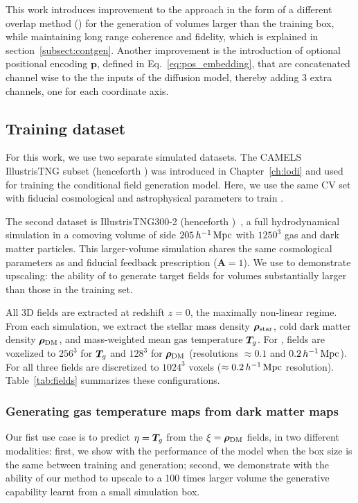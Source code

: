 This work introduces improvement to the \LODI approach in the form of a different overlap method (\FOLD) for the generation of volumes larger than the training box, while maintaining long range coherence and fidelity, which is explained in section~\ref{subsect:contgen}. Another improvement is the introduction of optional positional encoding $\mathbf{p}$, defined in Eq.~\ref{eq:pos_embedding}, that are concatenated channel wise to the the inputs of the diffusion model, thereby adding 3 extra channels, one for each coordinate axis.


\subsection{Training dataset}
For this work, we use two separate simulated datasets. The CAMELS IllustrisTNG subset (henceforth \CAMELS) was introduced in Chapter~\ref{ch:lodi} and used for training the conditional field generation model. Here, we use the same CV set with fiducial cosmological and astrophysical parameters to train \FOLD.

The second dataset is IllustrisTNG300-2 (henceforth \TNG)~\citep{nelson2021illustristngsimulationspublicdata}, a full hydrodynamical simulation in a comoving volume of side $205\,h^{-1}\,\mathrm{Mpc}$
with $1250^3$ gas and dark matter particles. This larger-volume simulation shares the same cosmological parameters as \CAMELS and fiducial feedback prescription ($\mathbf{A}=1$). We use \TNG to demonstrate upscaling: the ability of \FOLD to generate target fields for volumes substantially larger than those in the training set.

All 3D fields are extracted at redshift $z=0$, the maximally non-linear regime. From each simulation, we extract the stellar mass density $\bm{\rho}_\text{star}$, cold dark matter density $\boldsymbol{\rho}_\mathrm{DM}$, and mass-weighted mean gas temperature $\bm{T}_g$. For \CAMELS, fields are voxelized to $256^3$ for $\bm{T}_g$ and $128^3$ for $\boldsymbol{\rho}_\mathrm{DM}$ (resolutions $\approx 0.1$ and $0.2\,h^{-1}\,\mathrm{Mpc}$). For \TNG all three fields are discretized to $1024^3$ voxels ($\approx 0.2\,h^{-1}\,\mathrm{Mpc}$ resolution). Table~\ref{tab:fields} summarizes these configurations.



\subsubsection{Generating gas temperature maps from dark matter maps}\label{gasfromdm}

Our fist use case is to predict $\eta=\bm{T}_g$ from the $\xi=\boldsymbol{\rho}_\mathrm{DM}$ fields, in two different modalities: first, we show with \CAMELS the performance of the model when the box size is the same between training and generation; second, we demonstrate with \TNG the ability of our method to upscale to a 100 times larger volume the generative capability learnt from a small simulation box.

